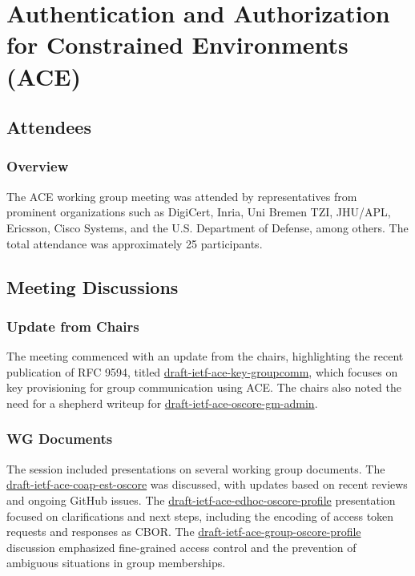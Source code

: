 \documentclass{article}
\begin{document}
\newpage

\section{Authentication and Authorization for Constrained Environments (ACE) }

\subsection{Attendees}

\subsubsection{Overview}
The ACE working group meeting was attended by representatives from prominent organizations such as DigiCert, Inria, Uni Bremen TZI, JHU/APL, Ericsson, Cisco Systems, and the U.S. Department of Defense, among others. The total attendance was approximately 25 participants.


\subsection{Meeting Discussions}

\subsubsection{Update from Chairs}
The meeting commenced with an update from the chairs, highlighting the recent publication of RFC 9594, titled \href{https://datatracker.ietf.org/doc/html/draft-ietf-ace-key-groupcomm}{draft-ietf-ace-key-groupcomm}, which focuses on key provisioning for group communication using ACE. The chairs also noted the need for a shepherd writeup for \href{https://datatracker.ietf.org/doc/html/draft-ietf-ace-oscore-gm-admin}{draft-ietf-ace-oscore-gm-admin}.

\subsubsection{WG Documents}
The session included presentations on several working group documents. The \href{https://datatracker.ietf.org/doc/html/draft-ietf-ace-coap-est-oscore}{draft-ietf-ace-coap-est-oscore} was discussed, with updates based on recent reviews and ongoing GitHub issues. The \href{https://datatracker.ietf.org/doc/html/draft-ietf-ace-edhoc-oscore-profile}{draft-ietf-ace-edhoc-oscore-profile} presentation focused on clarifications and next steps, including the encoding of access token requests and responses as CBOR. The \href{https://datatracker.ietf.org/doc/html/draft-ietf-ace-group-oscore-profile}{draft-ietf-ace-group-oscore-profile} discussion emphasized fine-grained access control and the prevention of ambiguous situations in group memberships.
\end{document}
